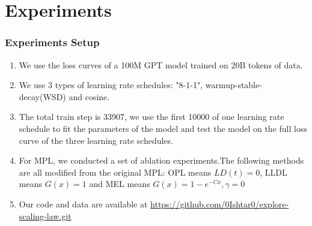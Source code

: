 \documentclass[aspectratio=169]{beamer}
\begin{document}
    \section{Experiments}\label{sec:experiments}

    \begin{frame}
        \frametitle{Experiments Setup}
        \begin{enumerate}
            \item We use the loss curves of a 100M GPT model trained on
            20B tokens of data.
            \item We use 3 types of learning rate schedules: "8-1-1",
            warmup-stable-decay(WSD) and cosine.
            \item The total train step is 33907, we use the first 10000
            of one learning rate schedule to fit the parameters of
            the model and test the model on the full loss curve of
            the three learning rate schedules.
            \item For MPL, we conducted a set of ablation experiments.The following methods are all
            modified from the original MPL: OPL means $LD(t)=0$, LLDL means $G(x)=1$ and MEL means $G(x) = 1-e^{-Cx},\gamma = 0$
            \item Our code and data are available at \url{https://github.com/0Ishtar0/explore-scaling-law.git}
        \end{enumerate}
    \end{frame}
\end{document}
